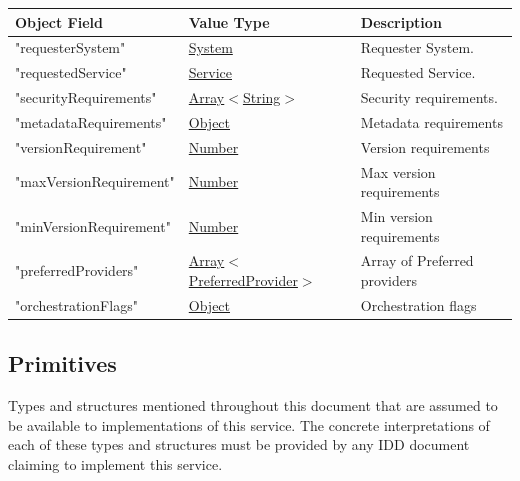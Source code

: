 \documentclass[a4paper]{arrowhead}
\newcommand{\mref}[1]{{\textcolor{ArrowheadPurple}{\hyperref[sec:model:#1]{#1}}}}
\newcommand{\pref}[1]{{\textcolor{ArrowheadGrey}{\hyperref[sec:model:primitives:#1]{#1}}}}
\begin{document}
\begin{table}[ht!]
\begin{tabularx}{\textwidth}{| p{5cm} | p{5cm} | X |} \hline
\rowcolor{gray!33} Object Field & Value Type      & Description \\ \hline
"requesterSystem"                   & \pref{System}     & Requester System. \\ \hline
"requestedService"                  & \pref{Service}   & Requested Service. \\ \hline
"securityRequirements"              & \pref{Array}$<$\mref{String}$>$     & Security requirements. \\ \hline
"metadataRequirements"              & \pref{Object}     & Metadata requirements \\ \hline
"versionRequirement"                & \pref{Number}     & Version requirements \\ \hline
"maxVersionRequirement"             & \pref{Number}     & Max version requirements \\ \hline
"minVersionRequirement"             & \pref{Number}     & Min version requirements \\ \hline
"preferredProviders"                & \pref{Array}$<$\mref{PreferredProvider}$>$   & Array of Preferred providers \\ \hline
"orchestrationFlags"                & \pref{Object}     & Orchestration flags \\ \hline

\end{tabularx}
\end{table}

\subsection{Primitives}
\label{sec:model:primitives}

Types and structures mentioned throughout this document that are assumed to be available to implementations of this service.
The concrete interpretations of each of these types and structures must be provided by any IDD document claiming to implement this service.
\end{document}
